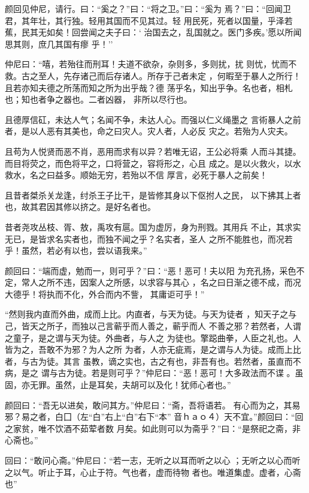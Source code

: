 \documentclass[]{article}
\begin{document}
颜回见仲尼，请行。曰：``奚之？''曰：``将之卫。''曰：``奚为
焉？''曰：``回闻卫君，其年壮，其行独。轻用其国而不见其过。轻
用民死，死者以国量，乎泽若蕉，民其无如矣！回尝闻之夫子曰：`
治国去之，乱国就之。医门多疾。'愿以所闻思其则，庶几其国有瘳 乎！''

仲尼曰：``嘻，若殆往而刑耳！夫道不欲杂，杂则多，多则扰，扰
则忧，忧而不救。古之至人，先存诸己而后存诸人。所存于己者未定
，何暇至于暴人之所行！且若亦知夫德之所荡而知之所为出乎哉？德
荡乎名，知出乎争。名也者，相札也；知也者争之器也。二者凶器，
非所以尽行也。

且德厚信矼，未达人气；名闻不争，未达人心。而强以仁义绳墨之
言術暴人之前者，是以人恶有其美也，命之曰灾人。灾人者，人必反
灾之。若殆为人灾夫。

且苟为人悦贤而恶不肖，恶用而求有以异？若唯无诏，王公必将乘
人而斗其捷。而目将荧之，而色将平之，口将营之，容将形之，心且
成之。是以火救火，以水救水，名之曰益多。顺始无穷，若殆以不信
厚言，必死于暴人之前矣！

且昔者桀杀关龙逢，纣杀王子比干，是皆修其身以下伛拊人之民，
以下拂其上者也，故其君因其修以挤之。是好名者也。

昔者尧攻丛枝、胥、敖，禹攻有扈。国为虚厉，身为刑戮。其用兵
不止，其求实无已，是皆求名实者也，而独不闻之乎？名实者，圣人
之所不能胜也，而况若乎！虽然，若必有以也，尝以语我来。''

颜回曰：``端而虚，勉而一，则可乎？''曰：``恶！恶可！夫以阳
为充孔扬，采色不定，常人之所不违，因案人之所感，以求容与其心
，名之曰日渐之德不成，而况大德乎！将执而不化，外合而内不訾，
其庸讵可乎！''

``然则我内直而外曲，成而上比。内直者，与天为徒。与天为徒者
，知天子之与己，皆天之所子，而独以己言蕲乎而人善之，蕲乎而人
不善之邪？若然者，人谓之童子，是之谓与天为徒。外曲者，与人之
为徒也。擎跽曲拳，人臣之礼也。人皆为之，吾敢不为邪？为人之所
为者，人亦无疵焉，是之谓与人为徒。成而上比者，与古为徒。其言
虽教，谪之实也，古之有也，非吾有也。若然者，虽直而不病，是之
谓与古为徒。若是则可乎？''仲尼曰：``恶！恶可！大多政法而不谍
。虽固，亦无罪。虽然，止是耳矣，夫胡可以及化！犹师心者也。''

颜回曰：``吾无以进矣，敢问其方。''仲尼曰：``斋，吾将语若。
有心而为之，其易邪？易之者，白囗（左``白''右上``白''右下``本''
音ｈａｏ４）天不宜。''颜回曰：``回之家贫，唯不饮酒不茹荤者数
月矣。如此则可以为斋乎？''曰：``是祭祀之斋，非心斋也。''

回曰：``敢问心斋。''仲尼曰：``若一志，无听之以耳而听之以心
；无听之以心而听之以气。听止于耳，心止于符。气也者，虚而待物
者也。唯道集虚。虚者，心斋也''
\end{document}
